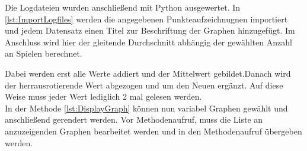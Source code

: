 Die Logdateien wurden anschließend mit Python ausgewertet. In \ref{lst:ImportLogfiles} werden die angegebenen Punkteaufzeichnugnen importiert und jedem Datensatz einen Titel zur Beschriftung der Graphen hinzugefügt. Im Anschluss wird hier der gleitende Durchschnitt abhängig der gewählten Anzahl an Spielen berechnet. 

Dabei werden erst alle Werte addiert und der Mittelwert gebildet.Danach wird der herrausrotierende Wert abgezogen und um den Neuen ergänzt. Auf diese Weise muss jeder Wert lediglich 2 mal gelesen werden. \\ In der Methode \ref{lst:DisplayGraph} können nun variabel Graphen gewählt und anschließend gerendert werden. Vor Methodenaufruf, muss die Liste an anzuzeigenden Graphen bearbeitet werden und in den Methodenaufruf übergeben werden. 



